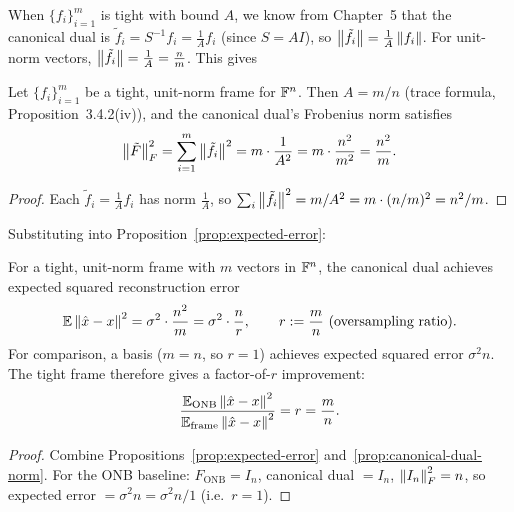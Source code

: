 When $\{f_i\}_{i=1}^m$ is tight with bound $A$, we know from
Chapter~5 that the canonical dual is $\tilde f_i = S^{-1}f_i =
\tfrac{1}{A}f_i$ (since $S=AI$), so
$\left\| \tilde f_i \right\| = \tfrac{1}{A}\left\| f_i \right\|$.
For unit-norm vectors, $\left\| \tilde f_i \right\|=\tfrac{1}{A}=\tfrac{n}{m}$.
This gives

\begin{proposition}
\label{prop:canonical-dual-norm}
Let $\{f_i\}_{i=1}^m$ be a tight, unit-norm frame for $\mathbb{F}^n$. Then
$A = m/n$ (trace formula, Proposition~3.4.2(iv)), and the canonical
dual's Frobenius norm satisfies
\begin{equation}
\label{eq:canonical-dual-norm}
  \left\| \tilde F \right\|_F^2 = \sum_{i=1}^m\left\| \tilde f_i \right\|^2
  = m\cdot\frac{1}{A^2} = m\cdot\frac{n^2}{m^2} = \frac{n^2}{m}.
\end{equation}
\end{proposition}

\begin{proof}
Each $\tilde f_i = \tfrac{1}{A}f_i$ has norm $\tfrac{1}{A}$, so
$\sum_i\left\| \tilde f_i \right\|^2 = m/A^2 = m\cdot(n/m)^2 = n^2/m$.
\end{proof}

Substituting into Proposition~\ref{prop:expected-error}:

\begin{theorem}
\label{thm:additive-noise-gain}
For a tight, unit-norm frame with $m$ vectors in $\mathbb{F}^n$, the canonical
dual achieves expected squared reconstruction error
\begin{equation}
\label{eq:noise-floor}
  \mathbb{E}\left\| \hat x - x \right\|^2 = \sigma^2 \cdot \frac{n^2}{m} = \sigma^2\cdot
  \frac{n}{r},
  \qquad r := \frac{m}{n} \text{ (oversampling ratio)}.
\end{equation}
For comparison, a basis ($m=n$, so $r=1$) achieves expected squared
error $\sigma^2 n$.  The tight frame therefore gives a factor-of-$r$
improvement:
\[
  \frac{\mathbb{E}_{\text{ONB}}\left\| \hat x-x \right\|^2}
       {\mathbb{E}_{\text{frame}}\left\| \hat x-x \right\|^2} = r = \frac{m}{n}.
\]
\end{theorem}

\begin{proof}
Combine Propositions~\ref{prop:expected-error}
and~\ref{prop:canonical-dual-norm}. For the ONB baseline: $F_{\text{ONB}}
=I_n$, canonical dual $=I_n$, $\left\| I_n \right\|_F^2 = n$, so expected error
$= \sigma^2 n = \sigma^2 n/1$ (i.e.\ $r=1$).
\end{proof}


